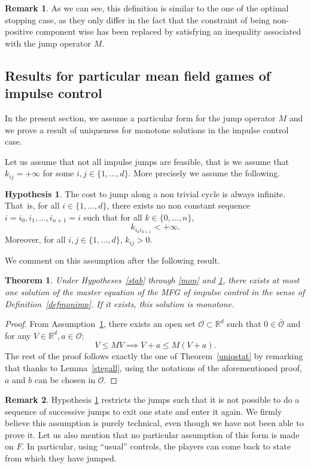 \documentclass[JEP,XML,SOM,Unicode,NoEqCountersInSection,published]{cedram}
\let\mathcal\mathscr
\newtheorem{Theorem}{Theorem}[section]
\theoremstyle{definition}
\newtheorem{Rem}{Remark}[section]
\newtheorem{hyp}{Hypothesis}
\begin{document}
\begin{Rem}
As we can see, this definition is similar to the one of the optimal stopping case, as they only differ in the fact that the constraint of being non-positive component wise has been replaced by satisfying an inequality associated with the jump operator $M$.
\end{Rem}
\subsection{Results for particular mean field games of impulse control}
In the present section, we 	assume a particular form for the jump operator $M$ and we prove a result of uniqueness for monotone solutions in the impulse control case.

Let us assume that not all impulse jumps are feasible, that is we assume that $k_{ij} =+\infty$ for some $i,j \in \{1,\dots,d\}$. More precisely we assume the following.
\begin{hyp}\label{clique}
The cost to jump along a non trivial cycle is always infinite. That~is, for all $i \in \{1,\dots,d\}$, there exists no non constant sequence $i = i_0, i_1,\dots,i_{n+1} = i$ such that for all $k \in \{0,\dots,n\}$,\vspace*{-5pt}
\begin{equation*}
k_{i_{k}i_{k+1}} <+\infty.
\end{equation*}
Moreover, for all $i,j \in \{1,\dots,d\}$, $k_{ij} > 0$.
\end{hyp}
We comment on this assumption after the following result.
\begin{Theorem}
Under Hypotheses~\ref{stab} through \ref{mon} and \ref{clique}, there exists at most one solution of the master equation of the MFG of impulse control in the sense of Definition~\ref{defmonimp}. If it exists, this solution is monotone.
\end{Theorem}
\begin{proof}
From Assumption~\ref{clique}, there exists an open set $\mathcal{O} \subset \mathbb{R}^d$ such that $0 \in \bar{\mathcal{O}}$ and for any $V \in \mathbb{R}^d, a \in \mathcal{O}$:\vspace*{-5pt}\enlargethispage{\baselineskip}%
\begin{equation*}
V \leq MV \implies V+a \leq M(V+a).
\end{equation*}
The rest of the proof follows exactly the one of Theorem~\ref{uniqstat} by remarking that thanks to Lemma~\ref{stegall}, using the notations of the aforementioned proof, $a$ and $b$ can be chosen in $\mathcal{O}$.
\end{proof}
\begin{Rem}
Hypothesis \ref{clique} restricts the jumps such that it is not possible to do a sequence of successive jumps to exit one state and enter it again. We firmly believe this assumption is purely technical, even though we have not been able to prove it. Let us also mention that no particular assumption of this form is made on $F$. In particular, using ``usual'' controls, the players can come back to state from which they have jumped.
\end{Rem}
\end{document}
